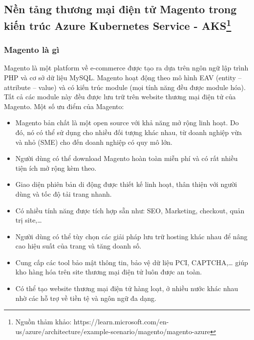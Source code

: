 \subsection{Nền tảng thương mại điện tử Magento trong kiến trúc Azure Kubernetes Service - AKS\protect\footnote{Nguồn thảm khảo: https://learn.microsoft.com/en-us/azure/architecture/example-scenario/magento/magento-azure}}
\subsubsection{Magento là gì}
Magento là một platform về e-commerce được tạo ra dựa trên ngôn ngữ lập trình PHP và cơ sở dữ liệu MySQL. Magento hoạt động theo mô hình EAV (entity – attribute – value) và có kiến trúc module (mọi tính năng đều được module hóa). Tất cả các module này đều được lưu trữ trên website thương mại điện tử của Magento.
\newline
Một số ưu điểm của Magento:
    \begin{itemize}
        \item Magento bản chất là một open source với khả năng mở rộng linh hoạt. Do đó, nó có thể sử dụng cho nhiều đối tượng khác nhau, từ doanh nghiệp vừa và nhỏ (SME) cho đến doanh nghiệp có quy mô lớn.
        \item Người dùng có thể download Magento hoàn toàn miễn phí và có rất nhiều tiện ích mở rộng kèm theo.
        \item Giao diện phiên bản di động được thiết kế linh hoạt, thân thiện với người dùng và tốc độ tải trang nhanh.
        \item Có nhiều tính năng được tích hợp sẵn như: SEO, Marketing, checkout, quản trị site,…
        \item Người dùng có thể tùy chọn các giải pháp lưu trữ hosting khác nhau để nâng cao hiệu suất của trang và tăng doanh số.
        \item Cung cấp các tool bảo mật thông tin, bảo vệ dữ liệu PCI, CAPTCHA,… giúp kho hàng hóa trên site thương mại điện tử luôn được an toàn.
        \item Có thể tạo website thương mại điện tử hàng loạt, ở nhiều nước khác nhau nhờ các hỗ trợ về tiền tệ và ngôn ngữ đa dạng.    
    \end{itemize}
